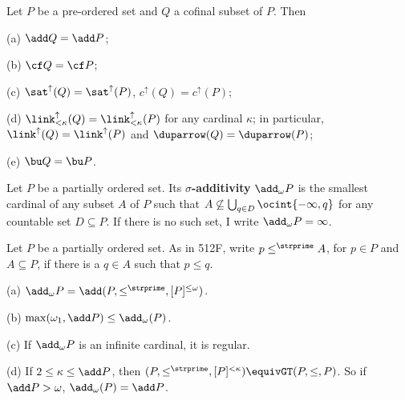  Let $P$ be a pre-ordered set and $Q$ a
cofinal subset of $P$.   Then

(a) $\add Q=\add P$;

(b) $\cf Q=\cf P$;

(c) $\sat^{\uparrow}(Q)=\sat^{\uparrow}(P)$,
$c^{\uparrow}(Q)=c^{\uparrow}(P)$;

(d) $\link_{<\kappa}^{\uparrow}(Q)=\link_{<\kappa}^{\uparrow}(P)$ for
any cardinal $\kappa$;  in particular,
$\link^{\uparrow}(Q)=\link^{\uparrow}(P)$ and
$\duparrow(Q)=\duparrow(P)$;

(e) $\bu Q=\bu P$.


 Let $P$ be a partially ordered set.   Its
{\bf $\sigma$-additivity} $\add_{\omega}P$ is the smallest cardinal of
any subset $A$ of $P$ such
that $A\not\subseteq\bigcup_{q\in D}\ocint{-\infty,q}$ for any countable
set $D\subseteq P$.   If there is no such set, I write $\add_{\omega}P=\infty$.

 Let $P$ be a partially ordered set.   As in
512F, write $p\le^{\strprime}A$, for $p\in P$ and $A\subseteq P$, if
there is a $q\in A$ such that $p\le q$.

(a) $\add_{\omega}P=\add(P,\le^{\strprime},[P]^{\le\omega})$.

(b) $\max(\omega_1,\add P)\le\add_{\omega}(P)$.

(c) If $\add_{\omega}P$ is an infinite cardinal, it is regular.

(d) If $2\le\kappa\le\add P$,
then $(P,\le^{\strprime},[P]^{<\kappa})\equivGT(P,\le,P)$.   So if
$\add P>\omega$, $\add_{\omega}(P)=\add P$.

